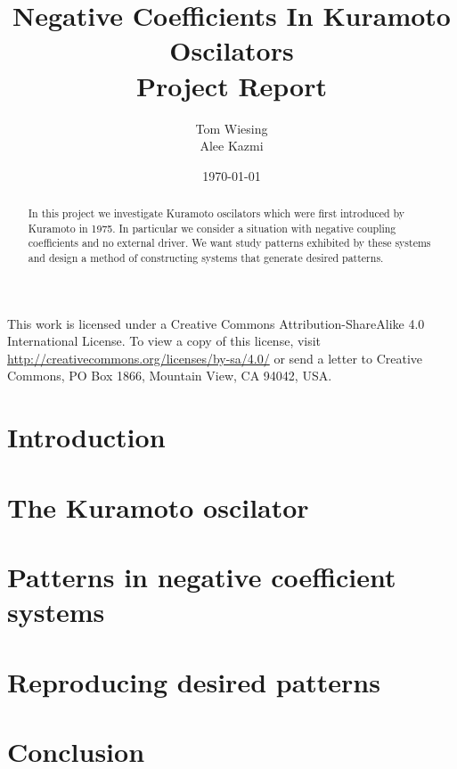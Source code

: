 \documentclass[12pt]{article}
\title{Negative Coefficients In Kuramoto Oscilators \\ Project Report}
\author{Tom Wiesing \\ Alee Kazmi}
\date{\today}
\begin{document}
	
	\maketitle
	
	
\begin{abstract}
	In this project we investigate Kuramoto oscilators which were first introduced by Kuramoto in 1975. In particular we consider a situation with negative coupling coefficients and no external driver. We want study patterns exhibited by these systems and design a method of constructing systems that generate desired patterns. 
\end{abstract}

	\newpage
	
	\tableofcontents
	
	
	\vspace{\fill}\noindent	This work is licensed under a Creative Commons Attribution-ShareAlike 4.0 International License. To view a copy of this license, visit \url{http://creativecommons.org/licenses/by-sa/4.0/} or send a letter to Creative Commons, PO Box 1866, Mountain View, CA 94042, USA. 
	\newpage
	
	\section{Introduction}
	
	\newpage
	
	\section{The Kuramoto oscilator}
	
	
	\section{Patterns in negative coefficient systems}
	
	
	\section{Reproducing desired patterns}
	
	
	\newpage
	\section{Conclusion}
	
	
	\printbibliography
\end{document}
